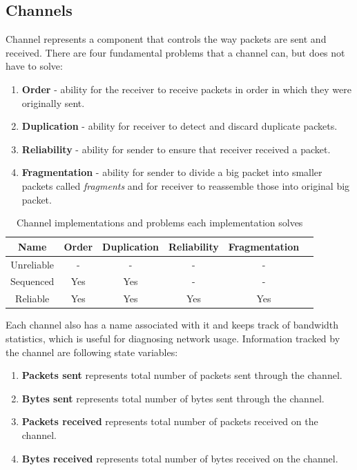 \documentclass[times, utf8, diplomski]{fer}
\begin{document}
\subsection{Channels}
Channel represents a component that controls the way packets are sent and received. There are four fundamental problems that a channel can, but does not have to solve:

\begin{enumerate}
	\item \textbf{Order} - ability for the receiver to receive packets in order in which they were originally sent.
	\item \textbf{Duplication} - ability for receiver to detect and discard duplicate packets.
	\item \textbf{Reliability} - ability for sender to ensure that receiver received a packet.
	\item \textbf{Fragmentation} - ability for sender to divide a big packet into smaller packets called \textit{fragments} and for receiver to reassemble those into original big packet.
\end{enumerate}

\begin{center}
	\begin{table}[H]
		\centering
		
		\begin{tabular}{ |c|c|c|c|c|c| } 
			\hline
			Name & Order & Duplication & Reliability & Fragmentation \\ 
			\hline
			Unreliable        & - & - & - & - \\ 
			Sequenced         & Yes & Yes & - & - \\ 
			Reliable          & Yes & Yes & Yes & Yes \\ 
			\hline
		\end{tabular}
		
		\caption{Channel implementations and problems each implementation solves}
	\end{table}
\end{center}

Each channel also has a name associated with it and keeps track of bandwidth statistics, which is useful for diagnosing network usage. Information tracked by the channel are following state variables:

\begin{enumerate}
	\item \textbf{Packets sent} represents total number of packets sent through the channel.
	\item \textbf{Bytes sent} represents total number of bytes sent through the channel.
	\item \textbf{Packets received} represents total number of packets received on the channel.
	\item \textbf{Bytes received} represents total number of bytes received on the channel.
\end{enumerate}
\end{document}
